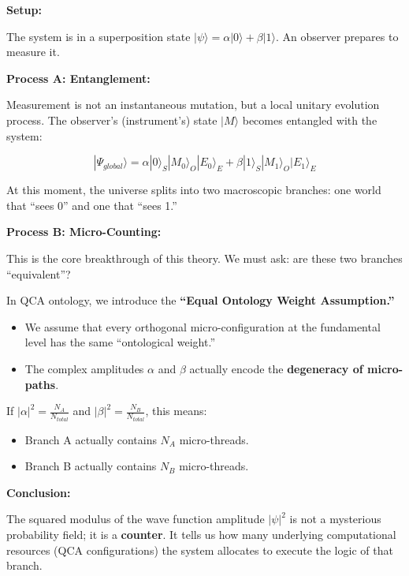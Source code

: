 \textbf{Setup:}

The system is in a superposition state \textbf{$|\psi\rangle = \alpha |0\rangle + \beta |1\rangle$}. An observer prepares to measure it.

\textbf{Process A: Entanglement:}

Measurement is not an instantaneous mutation, but a local unitary evolution process. The observer's (instrument's) state \textbf{$|M\rangle$} becomes entangled with the system:

$$|\Psi_{global}\rangle = \alpha |0\rangle_S |M_0\rangle_O |E_0\rangle_E + \beta |1\rangle_S |M_1\rangle_O |E_1\rangle_E$$

At this moment, the universe splits into two macroscopic branches: one world that ``sees 0'' and one that ``sees 1.''

\textbf{Process B: Micro-Counting:}

This is the core breakthrough of this theory. We must ask: are these two branches ``equivalent''?

In QCA ontology, we introduce the \textbf{``Equal Ontology Weight Assumption.''}

\begin{itemize}
\item We assume that every orthogonal micro-configuration at the fundamental level has the same ``ontological weight.''

\item The complex amplitudes \textbf{$\alpha$} and \textbf{$\beta$} actually encode the \textbf{degeneracy of micro-paths}.
\end{itemize}

If \textbf{$|\alpha|^2 = \frac{N_A}{N_{total}}$} and \textbf{$|\beta|^2 = \frac{N_B}{N_{total}}$}, this means:

\begin{itemize}
\item Branch A actually contains \textbf{$N_A$} micro-threads.

\item Branch B actually contains \textbf{$N_B$} micro-threads.
\end{itemize}

\textbf{Conclusion:}

The squared modulus of the wave function amplitude \textbf{$|\psi|^2$} is not a mysterious probability field; it is a \textbf{counter}. It tells us how many underlying computational resources (QCA configurations) the system allocates to execute the logic of that branch.

